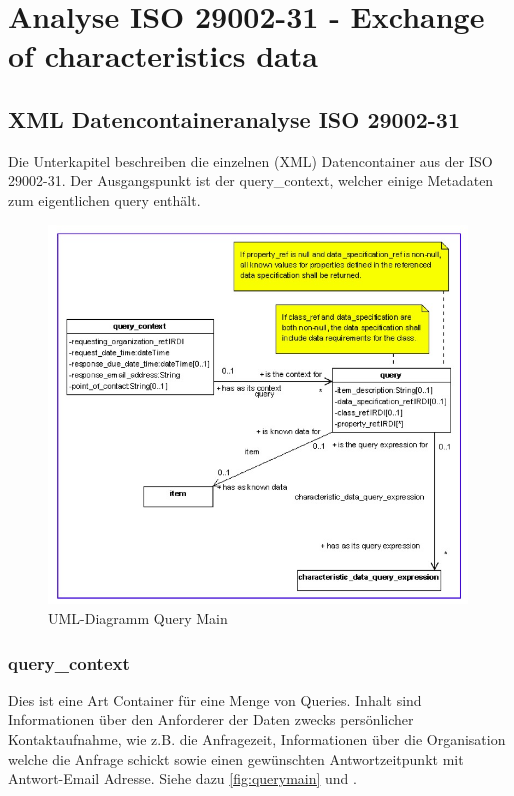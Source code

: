 \chapter{Analyse ISO 29002-31 - Exchange of characteristics data}\label{kap:analyse2900231}

\section{XML Datencontaineranalyse ISO 29002-31}
Die Unterkapitel beschreiben die einzelnen (XML) Datencontainer aus der ISO 29002-31. Der Ausgangspunkt ist der query\_context, welcher einige Metadaten zum eigentlichen query enthält. 

\begin{figure}[htbp]
	\centering
		\includegraphics[width=0.99\textwidth]{images/query_main.jpg}
		\caption[UML-Diagramm Query Main]{UML-Diagramm Query Main\footnotemark}
	\label{fig:querymain}
\end{figure}

\subsection{query\_context}
Dies ist eine Art Container für eine Menge von Queries. Inhalt sind Informationen über den Anforderer der Daten zwecks persönlicher Kontaktaufnahme, wie z.B. die Anfragezeit, Informationen über die Organisation welche die Anfrage schickt sowie einen gewünschten Antwortzeitpunkt mit Antwort-Email Adresse. Siehe dazu \autoref{fig:querymain} und \citep[Kap. 5.2.2][]{iso29002-31}.  

